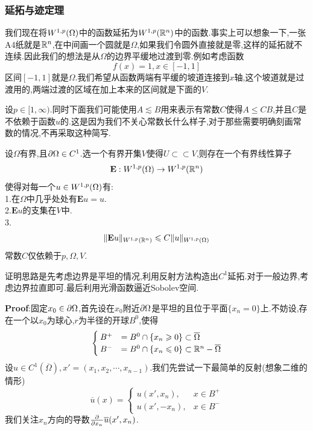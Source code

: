 \subsubsection{延拓与迹定理}
我们现在将$\Wkp[\Omega]{1}{p}$中的函数延拓为$\Wkp[\R ^n]{1}{p}$中的函数.事实上可以想象一下,一张A4纸就是$\mathbb{R} ^n$,在中间画一个圆就是$\Omega$,如果我们令圆外直接就是零,这样的延拓就不连续.因此我们的想法是从$\Omega$的边界平缓地过渡到零.例如考虑函数
$$
f(x)=1,x\in[-1,1]
$$
区间$[-1,1]$就是$\Omega$.我们希望从函数两端有平缓的坡道连接到$x$轴,这个坡道就是过渡用的,两端过渡的区域在加上本来的区间就是下面的$V$.\par
设$p\in [1,\infty)$.同时下面我们可能使用$A\lesssim B$用来表示有常数$C$使得$A\leqslant CB$,并且$C$是不依赖于函数$u$的.这是因为我们不关心常数长什么样子,对于那些需要明确刻画常数的情况,不再采取这种简写.
\begin{tcolorbox}[colback=KuangNei,colframe=BianKuang,title=\textbf{延拓定理},sharpish corners]
   设$\Omega$有界,且$\partial\Omega\in C^1$.选一个有界开集$V$使得$U\subset\subset V$,则存在一个有界线性算子
   $$
    \mathbf{E}:\Wkp[\Omega]{1}{p}\to \Wkp[\R ^n]{1}{p}
   $$
   使得对每一个$u\in \Wkp[\Omega]{1}{p}$有:\\
   1.在$\Omega$中几乎处处有$\mathbf{E}u=u$.\\
   2.$\mathbf{E}u$的支集在$V$中.\\
   3.
   $$
    \|\mathbf{E}u\|_{\Wkp[\R ^n]{1}{p}}\leqslant C\|u\|_{\Wkp[\Omega]{1}{p}}
   $$
   常数$C$仅依赖于$p,\Omega,V$.
\end{tcolorbox}
证明思路是先考虑边界是平坦的情况,利用反射方法构造出$C^1$延拓.对于一般边界,考虑边界拉直即可.最后利用光滑函数逼近Sobolev空间.\par
\textbf{Proof}:固定$x_0\in\partial\Omega$,首先设在$x_0$附近$\partial\Omega$是平坦的且位于平面$\{x_n=0\}$上.不妨设,存在一个以$x_0$为球心,$r$为半径的开球$B^0$,使得
$$
\begin{cases}
    B^+&=B^0\cap \{x_n\geqslant 0\}\subset \overline{\Omega}\\
    B^-&=B^0\cap \{x_n\leqslant 0\}\subset \mathbb{R}^n-\overline{\Omega}
\end{cases}
$$
设$u\in C^1(\overline{\Omega}),x'=(x_1,x_2,\cdots,x_{n-1})$.我们先尝试一下最简单的反射(想象二维的情形)
$$
\overline{u}(x)=
\begin{cases}
    u(x',x_n),&x\in B^+\\
    u(x',-x_n),&x\in B^-
\end{cases}
$$
我们关注$x_n$方向的导数$\frac{\partial}{\partial x_n}\overline{u}(x',x_n)$.\par
